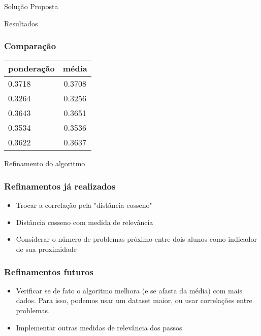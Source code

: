 \documentclass{article}
\begin{document}
\begin{section}{Solução Proposta}
\begin{subsection}{Resultados}
         \subsubsection{Comparação}
         \begin{center} 
         \begin{tabular}{ l | c  }
           ponderação  &  média \\
           \hline
           0.3718 & 0.3708 \\
           0.3264 & 0.3256 \\
           0.3643 & 0.3651 \\
           0.3534 & 0.3536 \\
           0.3622 & 0.3637 \\
         \end{tabular}
         \end{center}

      \end{subsection}
      \begin{subsection}{Refinamento do algoritmo}
         \subsubsection{Refinamentos já realizados}
            \begin{itemize} 
            \item Trocar a correlação pela "distância cosseno"
            \item Distância cosseno com medida de relevância
            \item Considerar o número de problemas próximo entre dois alunos como indicador de sua proximidade
            \end{itemize}


         \subsubsection{Refinamentos futuros}
            \begin{itemize}
            \item Verificar se de fato o algoritmo melhora (e se afasta da média) com mais dados. Para isso, podemos usar um dataset maior, ou usar correlações entre problemas.
            \item Implementar outras medidas de relevância dos passos
            \end{itemize}
      \end{subsection}
   \end{section}
\end{document}
